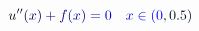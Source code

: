 \documentclass[12pt]{article}
\begin{document}
\makeatletter
\renewcommand*{\@textcolor}[3]{%
  \protect\leavevmode
  \begingroup
    \color#1{#2}#3%
  \endgroup
}
\makeatother
\begin{displaymath}
\mathcolor[RGB]{0,0,15}{u} ^ { \mathcolor[RGB]{0,0,30}{\prime} \mathcolor[RGB]{0,0,45}{\prime} } \mathcolor[RGB]{0,0,60}{(} \mathcolor[RGB]{0,0,75}{x} \mathcolor[RGB]{0,0,90}{)} \mathcolor[RGB]{0,0,105}{+} \mathcolor[RGB]{0,0,120}{f} \mathcolor[RGB]{0,0,135}{(} \mathcolor[RGB]{0,0,150}{x} \mathcolor[RGB]{0,0,165}{)} \mathcolor[RGB]{0,0,180}{=} \mathcolor[RGB]{0,0,195}{0} \quad \mathcolor[RGB]{0,0,210}{x} \mathcolor[RGB]{0,0,225}{\in} \mathcolor[RGB]{0,0,240}{(} \mathcolor[RGB]{0,0,255}{0} \mathcolor[RGB]{0,15,0}{,} \mathcolor[RGB]{0,15,15}{0} \mathcolor[RGB]{0,15,30}{.} \mathcolor[RGB]{0,15,45}{5} \mathcolor[RGB]{0,15,60}{)}
\end{displaymath}
\end{document}
